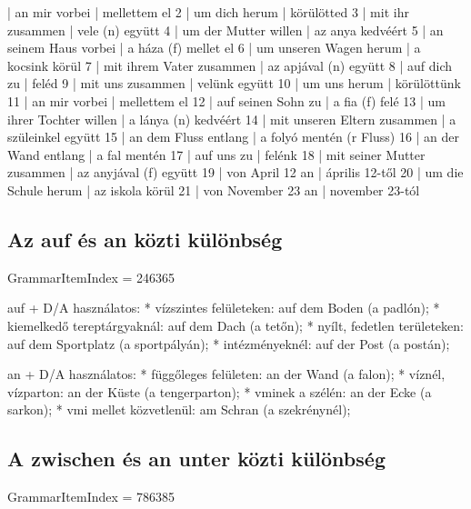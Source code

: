 \documentclass{article}
\newenvironment{desc}{\verbatim}{\endverbatim}
\newenvironment{exmp}{\verbatim}{\endverbatim}
\begin{document}
\begin{exmp}
1 | an mir vorbei | mellettem el
2 | um dich herum | körülötted
3 | mit ihr zusammen | vele (n) együtt
4 | um der Mutter willen | az anya kedvéért
5 | an seinem Haus vorbei | a háza (f) mellet el
6 | um unseren Wagen herum | a kocsink körül
7 | mit ihrem Vater zusammen | az apjával (n) együtt
8 | auf dich zu | feléd
9 | mit uns zusammen | velünk együtt
10 | um uns herum | körülöttünk
11 | an mir vorbei | mellettem el
12 | auf seinen Sohn zu | a fia (f) felé
13 | um ihrer Tochter willen | a lánya (n) kedvéért
14 | mit unseren Eltern zusammen | a szüleinkel együtt
15 | an dem Fluss entlang | a folyó mentén (r Fluss)
16 | an der Wand entlang | a fal mentén
17 | auf uns zu | felénk
18 | mit seiner Mutter zusammen | az anyjával (f) együtt
19 | von April 12 an | április 12-től
20 | um die Schule herum | az iskola körül
21 | von November 23 an | november 23-tól
\end{exmp}

\subsection{Az auf és an közti különbség}

GrammarItemIndex = 246365

\begin{desc}
auf + D/A használatos:
* vízszintes felületeken: auf dem Boden (a padlón);
* kiemelkedő tereptárgyaknál: auf dem Dach (a tetőn);
* nyílt, fedetlen területeken: auf dem Sportplatz (a sportpályán);
* intézményeknél: auf der Post (a postán);

an + D/A használatos:
* függőleges felületen: an der Wand (a falon);
* víznél, vízparton: an der Küste (a tengerparton);
* vminek a szélén: an der Ecke (a sarkon);
* vmi mellet közvetlenül: am Schran (a szekrénynél);
\end{desc}

\begin{exmp}
\end{exmp}

\subsection{A zwischen és an unter közti különbség}

GrammarItemIndex = 786385

\begin{desc}
\end{desc}

\begin{exmp}
\end{exmp}
\end{document}

